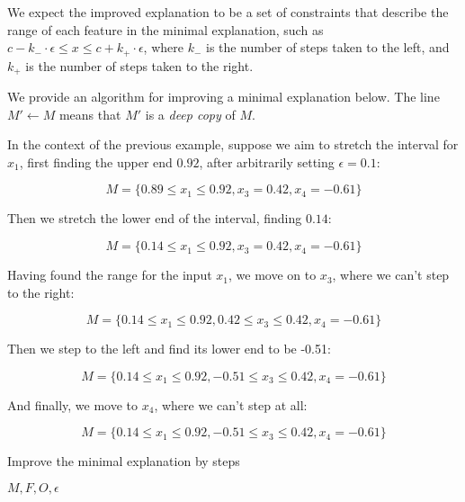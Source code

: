 \documentclass[12pt]{article}
\begin{document}
We expect the improved explanation to be a set of constraints that describe the range of each feature in the minimal explanation, such as $c - k_{-} \cdot \epsilon \le x \le c + k_{+} \cdot \epsilon$, where $k_{-}$ is the number of steps taken to the left, and $k_{+}$ is the number of steps taken to the right.

We provide an algorithm for improving a minimal explanation below. The line $M' \gets M$ means that $M'$ is a \emph{deep copy} of $M$.

In the context of the previous example, suppose we aim to stretch the interval for $x_1$, first finding the upper end $0.92$, after arbitrarily setting $\epsilon = 0.1$:

\[
M = \{0.89 \le x_1 \le 0.92,
      x_3 = 0.42,
      x_4 = -0.61\}
\]

Then we stretch the lower end of the interval, finding $0.14$:

\[
M = \{0.14 \le x_1 \le 0.92,
      x_3 = 0.42,
      x_4 = -0.61\}
\]

Having found the range for the input $x_1$, we move on to $x_3$, where we can't step to the right:

\[
M = \{0.14 \le x_1 \le 0.92,
      0.42 \le x_3 \le 0.42,
      x_4 = -0.61\}
\]

Then we step to the left and find its lower end to be -0.51:

\[
M = \{0.14 \le x_1 \le 0.92,
      -0.51 \le x_3 \le 0.42,
      x_4 = -0.61\}
\]

And finally, we move to $x_4$, where we can't step at all:

\[
M = \{0.14 \le x_1 \le 0.92,
      -0.51 \le x_3 \le 0.42,
      x_4 = -0.61\}
\]




\begin{algorithm}
	\caption{Improve the minimal explanation by steps}
	\begin{algorithmic}
		 {$M, F, O, \epsilon$}
				\EndWhile
				\\
				\EndWhile
			\EndFor
			\\
		\EndProcedure
	\end{algorithmic}
\end{algorithm}
\end{document}

